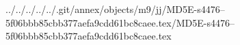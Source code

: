 ../../../../../.git/annex/objects/m9/jj/MD5E-s4476--5f06bbb85cbb377aefa9cdd61bc8caee.tex/MD5E-s4476--5f06bbb85cbb377aefa9cdd61bc8caee.tex